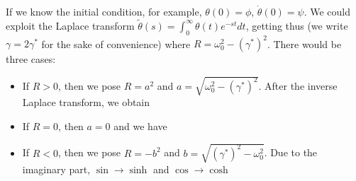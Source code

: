 \documentclass[article,12pt]{elegantpaper}
\begin{document}
If we know the initial condition, for example, $\theta(0) = \phi$, $\dot\theta(0) = \psi$. We could exploit the Laplace transform $\tilde\theta(s) = \int_0^\infty \theta(t) e^{-st} dt$, getting
thus (we write $\gamma = 2\gamma^\ast$ for the sake of convenience)
where $R = \omega_0^2 - (\gamma^\ast)^2$. There would be three cases:
\begin{itemize}
  \item If $R>0$, then we pose $R=a^2$ and $a=\sqrt{\omega_0^2 - (\gamma^\ast)^2}$. After the inverse Laplace transform, we obtain 
  
  \item If $R=0$, then $a=0$ and we have
  
  \item If $R<0$, then we pose $R=-b^2$ and $b = \sqrt{(\gamma^\ast)^2 - \omega_0^2}$. Due to the imaginary part, $\sin \to \sinh$ and $\cos \to \cosh$
\end{itemize}
\end{document}
